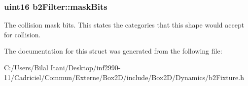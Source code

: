 \subsubsection[{\texorpdfstring{mask\+Bits}{maskBits}}]{\setlength{\rightskip}{0pt plus 5cm}uint16 b2\+Filter\+::mask\+Bits}\hypertarget{structb2_filter_a533cccf85e3ba3d9e3700d73b819f6e2}{}\label{structb2_filter_a533cccf85e3ba3d9e3700d73b819f6e2}
The collision mask bits. This states the categories that this shape would accept for collision. 

The documentation for this struct was generated from the following file\+:\begin{DoxyCompactItemize}
\item 
C\+:/\+Users/\+Bilal Itani/\+Desktop/inf2990-\/11/\+Cadriciel/\+Commun/\+Externe/\+Box2\+D/include/\+Box2\+D/\+Dynamics/b2\+Fixture.\+h\end{DoxyCompactItemize}
